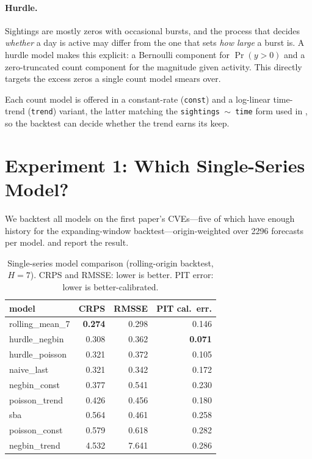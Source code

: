 \documentclass[]{article}
\begin{document}
\paragraph{Hurdle.} Sightings are mostly zeros with occasional bursts, and the
process that decides \emph{whether} a day is active may differ from the one that
sets \emph{how large} a burst is. A hurdle model \cite{mullahy1986specification}
makes this explicit: a Bernoulli component for $\Pr(y>0)$ and a zero-truncated
count component for the magnitude given activity. This directly targets the excess
zeros a single count model smears over.

Each count model is offered in a constant-rate (\texttt{const}) and a log-linear
time-trend (\texttt{trend}) variant, the latter matching the
\texttt{sightings\,$\sim$\,time} form used in \cite{bonhomme2026modeling}, so the
backtest can decide whether the trend earns its keep.

\section{Experiment 1: Which Single-Series Model?}\label{sec:tier1}
We backtest all models on the first paper's CVEs---five of which have enough
history for the expanding-window backtest---origin-weighted over 2296 forecasts per
model.  and  report the result.

\begin{table}[H]
\centering
\caption{Single-series model comparison (rolling-origin backtest, $H=7$). CRPS and
RMSSE: lower is better. PIT error: lower is better-calibrated.}
\label{tab:tier1}
\begin{tabular}{lrrr}
\toprule
model & CRPS & RMSSE & PIT cal.\ err. \\
\midrule
rolling\_mean\_7        & \textbf{0.274} & 0.298 & 0.146 \\
hurdle\_negbin          & 0.308 & 0.362 & \textbf{0.071} \\
hurdle\_poisson         & 0.321 & 0.372 & 0.105 \\
naive\_last             & 0.321 & 0.342 & 0.172 \\
negbin\_const           & 0.377 & 0.541 & 0.230 \\
poisson\_trend          & 0.426 & 0.456 & 0.180 \\
sba                     & 0.564 & 0.461 & 0.258 \\
poisson\_const          & 0.579 & 0.618 & 0.282 \\
negbin\_trend           & 4.532 & 7.641 & 0.286 \\
\bottomrule
\end{tabular}
\end{table}
\end{document}
